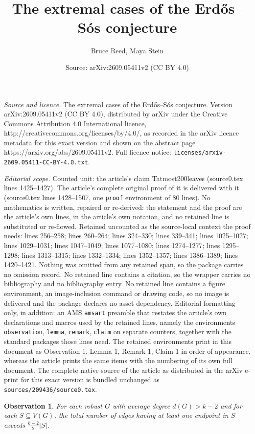 \documentclass[10pt,a4paper]{amsart}
\title{The extremal cases of the Erd\H os--S\'os conjecture}
\author{Bruce Reed, Maya Stein}
\date{Source: arXiv:2609.05411v2 (CC BY 4.0)}
\newtheorem{observation}{Observation}
\begin{document}
\maketitle

\noindent\emph{Source and licence.} The extremal cases of the Erd\H os--S\'os conjecture. Version arXiv:2609.05411v2 (CC BY 4.0), distributed by arXiv under the Creative Commons Attribution 4.0 International licence, http://creativecommons.org/licenses/by/4.0/, as recorded in the arXiv licence metadata for this exact version and shown on the abstract page https://arxiv.org/abs/2609.05411v2. Full licence notice: \texttt{licenses/arxiv-2609.05411-CC-BY-4.0.txt}.\par\smallskip

\noindent\textit{Editorial scope.} Counted unit: the article's claim Tatmost200leaves (source0.tex lines 1425--1427). The article's complete original proof of it is delivered with it (source0.tex lines 1428--1507, one \texttt{proof} environment of 80 lines). No mathematics is written, repaired or re-derived: the statement and the proof are the article's own lines, in the article's own notation, and no retained line is substituted or re-flowed.  Retained uncounted as the source-local context the proof needs: lines 256--258; lines 260--264; lines 324--330; lines 339--341; lines 1025--1027; lines 1029--1031; lines 1047--1049; lines 1077--1080; lines 1274--1277; lines 1295--1298; lines 1313--1315; lines 1332--1334; lines 1352--1357; lines 1386--1389; lines 1420--1421.  Nothing was omitted from any retained span, so the package carries no omission record.  No retained line contains a citation, so the wrapper carries no bibliography and no bibliography entry.  No retained line contains a figure environment, an image-inclusion command or drawing code, so no image is delivered and the package declares no asset dependency.  Editorial formatting only, in addition: an AMS \texttt{amsart} preamble that restates the article's own declarations and macros used by the retained lines, namely the environments \texttt{observation}, \texttt{lemma}, \texttt{remark}, \texttt{claim} on separate counters, together with the standard packages those lines need.  The retained environments print in this document as Observation 1, Lemma 1, Remark 1, Claim 1 in order of appearance, whereas the article prints the same items with the numbering of its own full document.  The complete native source of the article as distributed in the arXiv e-print for this exact version is bundled unchanged as \texttt{sources/209436/source0.tex}.
\begin{observation}\label{minimalityOfG}
For each robust  $G$ with average degree   $d(G)>k-2$ and for each $S\subseteq V(G)$,  the total number of edges having at least one endpoint in $S$  exceeds $\frac{k-2}2 |S|$.
\end{observation}
\end{document}
